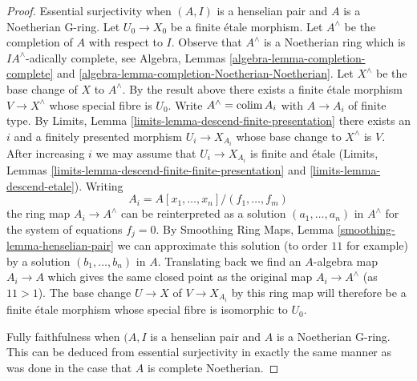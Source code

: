 \begin{proof}
\medskip\noindent
Essential surjectivity when $(A, I)$ is a henselian pair
and $A$ is a Noetherian G-ring.
Let $U_0 \to X_0$ be a finite \'etale morphism.
Let $A^\wedge$ be the completion of $A$ with respect to $I$.
Observe that $A^\wedge$ is a Noetherian ring which is
$IA^\wedge$-adically complete, see Algebra, Lemmas
\ref{algebra-lemma-completion-complete} and
\ref{algebra-lemma-completion-Noetherian-Noetherian}.
Let $X^\wedge$ be the base change of $X$ to $A^\wedge$.
By the result above there exists a finite \'etale morphism
$V \to X^\wedge$ whose special fibre is $U_0$.
Write $A^\wedge = \mathop{\mathrm{colim}}\nolimits A_i$ with $A \to A_i$ of finite type.
By Limits, Lemma \ref{limits-lemma-descend-finite-presentation}
there exists an $i$ and a finitely presented morphism $U_i \to X_{A_i}$
whose base change to $X^\wedge$ is $V$. After increasing $i$
we may assume that $U_i \to X_{A_i}$ is finite and \'etale
(Limits, Lemmas \ref{limits-lemma-descend-finite-finite-presentation} and
\ref{limits-lemma-descend-etale}). Writing
$$
A_i = A[x_1, \ldots, x_n]/(f_1, \ldots, f_m)
$$
the ring map $A_i \to A^\wedge$ can be reinterpreted as a solution
$(a_1, \ldots, a_n)$ in $A^\wedge$ for the system of equations $f_j = 0$.
By Smoothing Ring Maps, Lemma \ref{smoothing-lemma-henselian-pair}
we can approximate this solution (to order $11$ for example) by a solution
$(b_1, \ldots, b_n)$ in $A$. Translating back we find an $A$-algebra map
$A_i \to A$ which gives the same closed point as the original map
$A_i \to A^\wedge$ (as $11 > 1$). The base change $U \to X$ of $V \to X_{A_i}$
by this ring map will therefore be a finite \'etale morphism whose
special fibre is isomorphic to $U_0$.

\medskip\noindent
Fully faithfulness when $(A, I$ is a henselian pair and $A$ is a Noetherian
G-ring. This can be deduced from essential surjectivity in exactly the same
manner as was done in the case that $A$ is complete Noetherian.


\end{proof}
